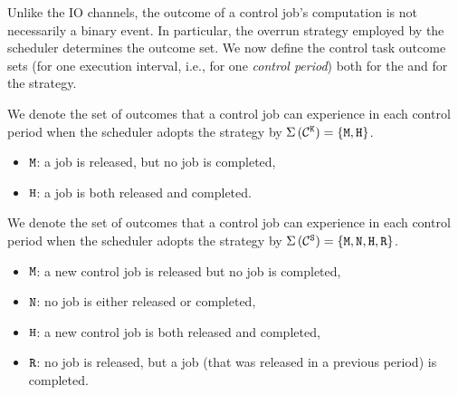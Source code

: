Unlike the IO channels, the outcome of a control job's computation is not necessarily a binary event.
In particular, the overrun strategy employed by the scheduler determines the outcome set.
We now define the control task outcome sets (for one execution interval, i.e., for one \emph{control period}) both for the \tK{} and for the \tS{} strategy.
%
\begin{definition}%
    \label{def:kill}%
    We denote the set of outcomes that a control job can experience in each control period when the scheduler adopts the \tK{} strategy by $\Sigma\,({\mathcal{C}^{\texttt{K}}}) = \left\{ \texttt{M}, \texttt{H} \right\}$.
    \begin{itemize}
        \item $\texttt{M}$: a job is released, but no job is completed, 
        \item $\texttt{H}$: a job is both released and completed.
    \end{itemize}
\end{definition}
%
\begin{definition}%
    \label{def:skip}%
    We denote the set of outcomes that a control job can experience in each control period when the scheduler adopts the \tS{} strategy by $\Sigma\,({\mathcal{C}^{\texttt{S}}}) = \left\{ \texttt{M}, \texttt{N}, \texttt{H}, \texttt{R} \right\}$.
    \begin{itemize}
        \item $\texttt{M}$: a new control job is released but no job is completed,
        \item $\texttt{N}$: no job is either released or completed, 
        \item $\texttt{H}$: a new control job is both released and completed,
        \item $\texttt{R}$: no job is released, but a job (that was released in a previous period) is completed.
    \end{itemize}
\end{definition}
%


